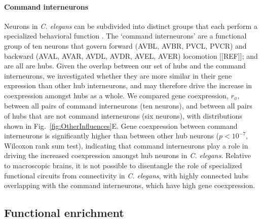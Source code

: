 \documentclass[10pt,letterpaper]{article}
\begin{document}
\paragraph{Command interneurons} 
Neurons in \emph{C. elegans} can be subdivided into distinct groups that each perform a specialized behavioral function \cite{Hobert2003}.
The `command interneurons' are a functional group of ten neurons that govern forward (AVBL, AVBR, PVCL, PVCR) and backward (AVAL, AVAR, AVDL, AVDR, AVEL, AVER) locomotion [[REF]]; and are all are hubs.
Given the overlap between our set of hubs and the command interneurons, we investigated whether they are more similar in their gene expression than other hub interneurons, and may therefore drive the increase in coexpression amongst hubs as a whole.
We compared gene coexpression, $r_\phi$, between all pairs of command interneurons (ten neurons), and between all pairs of hubs that are not command interneurons (six neurons), with distributions shown in Fig.~\ref{fig:OtherInfluences}E.
Gene coexpression between command interneurons is significantly higher than between other hub neurons ($p < 10^{-7}$, Wilcoxon rank sum test), indicating that command interneurons play a role in driving the increased coexpression amongst hub neurons in \emph{C. elegans}.
Relative to macroscopic brains, it is not possible to disentangle the role of specialized functional circuits from connectivity in \emph{C. elegans}, with highly connected hubs overlapping with the command interneurons, which have high gene coexpression.


\subsection*{Functional enrichment}

\end{document}

